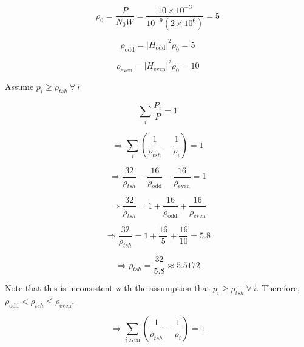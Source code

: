 \documentclass[fleqn]{article}
\begin{document}
\begin{enumerate}
		\begin{equation*}
			\rho_0 = \frac{P}{N_0W} = \frac{10 \times 10^{-3}}{10^{-9}(2 \times 10^6)} = 5
		\end{equation*}
		
		\begin{equation*}
			\rho_{\text{odd}} = |H_{\text{odd}}|^2\rho_0 = 5
		\end{equation*}
		
		\begin{equation*}
			\rho_{\text{even}} = |H_{\text{even}}|^2\rho_0 = 10
		\end{equation*}
		
		Assume $p_i \geq \rho_{tsh}\ \forall\ i$
		
		\begin{equation*}
			\sum_i{\frac{P_i}{P}} = 1
		\end{equation*}
		
		\begin{equation*}
			\Rightarrow \sum_i{\left(\frac{1}{\rho_{tsh}} - \frac{1}{\rho_i}\right)} = 1
		\end{equation*}
		
		\begin{equation*}
			\Rightarrow \frac{32}{\rho_{tsh}} - \frac{16}{\rho_{\text{odd}}} - \frac{16}{\rho_{\text{even}}} = 1
		\end{equation*}
		
		\begin{equation*}
			\Rightarrow \frac{32}{\rho_{tsh}} = 1 + \frac{16}{\rho_{\text{odd}}} + \frac{16}{\rho_{\text{even}}}
		\end{equation*}
		
		\begin{equation*}
			\Rightarrow \frac{32}{\rho_{tsh}} = 1 + \frac{16}{5} + \frac{16}{10} = 5.8
		\end{equation*}
		
		\begin{equation*}
			\Rightarrow \rho_{tsh} = \frac{32}{5.8} \approx 5.5172
		\end{equation*}
		
		Note that this is inconsistent with the assumption that $p_i \geq \rho_{tsh}\ \forall\ i$. Therefore, $\rho_{\text{odd}} < \rho_{tsh} \leq \rho_{\text{even}}$.
		
		\begin{equation*}
			\Rightarrow \sum_{i\ \text{even}}{\left(\frac{1}{\rho_{tsh}} - \frac{1}{\rho_i}\right)} = 1
		\end{equation*}
		

\end{enumerate}
\end{document}
